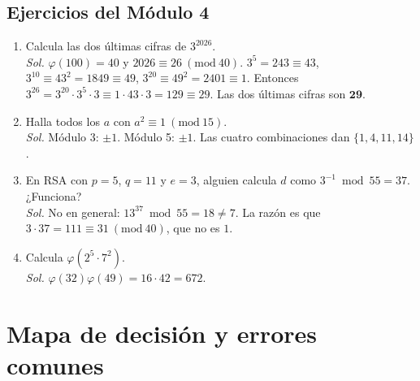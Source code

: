 \documentclass[11pt,a4paper]{article}
\theoremstyle{definition}
\newcommand{\md}[1]{\ (\mathrm{mod}\ #1)}
\theoremstyle{notait}
\theoremstyle{nota}
\begin{document}
\subsection*{Ejercicios del Módulo 4}
\begin{enumerate}[label=\textbf{4.\arabic*}]
\item Calcula las dos últimas cifras de $3^{2026}$.\\
\emph{Sol.} $\varphi(100)=40$ y $2026\equiv26\md{40}$. $3^{5}=243\equiv43$, $3^{10}\equiv43^2=1849\equiv49$, $3^{20}\equiv49^2=2401\equiv1$. Entonces $3^{26}=3^{20}\cdot3^5\cdot3\equiv1\cdot43\cdot3=129\equiv29$. Las dos últimas cifras son $\mathbf{29}$.
\item Halla todos los $a$ con $a^2\equiv1\md{15}$.\\
\emph{Sol.} Módulo 3: $\pm1$. Módulo 5: $\pm1$. Las cuatro combinaciones dan $\{1,4,11,14\}$.
\item En RSA con $p=5$, $q=11$ y $e=3$, alguien calcula $d$ como $3^{-1}\bmod55=37$. ¿Funciona?\\
\emph{Sol.} No en general: $13^{37}\bmod55=18\neq7$. La razón es que $3\cdot37=111\equiv31\md{40}$, que no es $1$.
\item Calcula $\varphi(2^5\cdot 7^2)$.\\
\emph{Sol.} $\varphi(32)\varphi(49)=16\cdot42=672$.
\end{enumerate}

\newpage
\section{Mapa de decisión y errores comunes}
\end{document}
